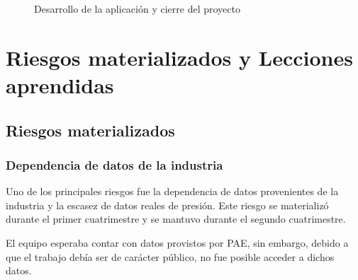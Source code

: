 \documentclass[12pt,a4paper]{article}
\begin{document}
\begin{figure}[htbp]


\caption{Desarrollo de la aplicación y cierre del proyecto}
\end{figure}

\newpage
\section{Riesgos materializados y Lecciones aprendidas}

\subsection{Riesgos materializados}

\subsubsection{Dependencia de datos de la industria}

Uno de los principales riesgos fue la dependencia de datos provenientes de la industria y la 
escasez de datos reales de presión. Este riesgo se materializó durante el primer cuatrimestre y
se mantuvo durante el segundo cuatrimestre.

El equipo esperaba contar con datos provistos por PAE, sin embargo, debido a que el trabajo
debía ser de carácter público, no fue posible acceder a dichos datos.
\end{document}
